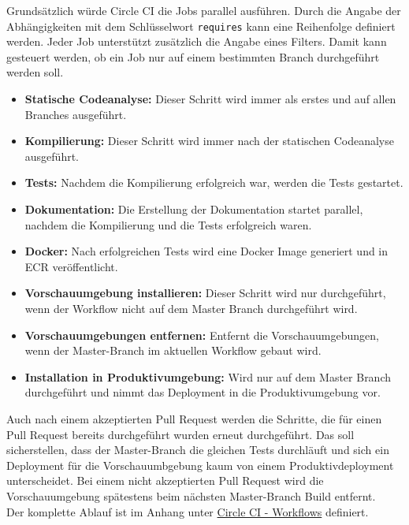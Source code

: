 Grundsätzlich würde Circle CI die Jobs parallel ausführen.
Durch die Angabe der Abhängigkeiten mit dem Schlüsselwort \texttt{requires} kann eine Reihenfolge definiert werden.
Jeder Job unterstützt zusätzlich die Angabe eines Filters.
Damit kann gesteuert werden, ob ein Job nur auf einem bestimmten Branch durchgeführt werden soll.

\begin{itemize}
  \item \textbf{Statische Codeanalyse:}
  Dieser Schritt wird immer als erstes und auf allen Branches ausgeführt.

  \item \textbf{Kompilierung:}
  Dieser Schritt wird immer nach der statischen Codeanalyse ausgeführt.

  \item \textbf{Tests:}
  Nachdem die Kompilierung erfolgreich war, werden die Tests gestartet.

  \item \textbf{Dokumentation:}
  Die Erstellung der Dokumentation startet parallel, nachdem die Kompilierung und die Tests erfolgreich waren.

  \item \textbf{Docker:}
  Nach erfolgreichen Tests wird eine Docker Image generiert und in ECR veröffentlicht.

  \item \textbf{Vorschauumgebung installieren:}
  Dieser Schritt wird nur durchgeführt, wenn der Workflow nicht auf dem Master Branch durchgeführt wird.

  \item \textbf{Vorschauumgebungen entfernen:}
  Entfernt die Vorschauumgebungen, wenn der Master-Branch im aktuellen Workflow gebaut wird.

  \item \textbf{Installation in Produktivumgebung:}
  Wird nur auf dem Master Branch durchgeführt und nimmt das Deployment in die Produktivumgebung vor.
\end{itemize}

Auch nach einem akzeptierten Pull Request werden die Schritte, die für einen Pull Request bereits durchgeführt wurden erneut durchgeführt.
Das soll sicherstellen, dass der Master-Branch die gleichen Tests durchläuft und sich ein Deployment für die Vorschauumbgebung kaum von einem Produktivdeployment unterscheidet.
Bei einem nicht akzeptierten Pull Request wird die Vorschauumgebung spätestens beim nächsten Master-Branch Build entfernt. \\

Der komplette Ablauf ist im Anhang unter \hyperref[lst:circle_workflows]{Circle CI - Workflows} definiert.

